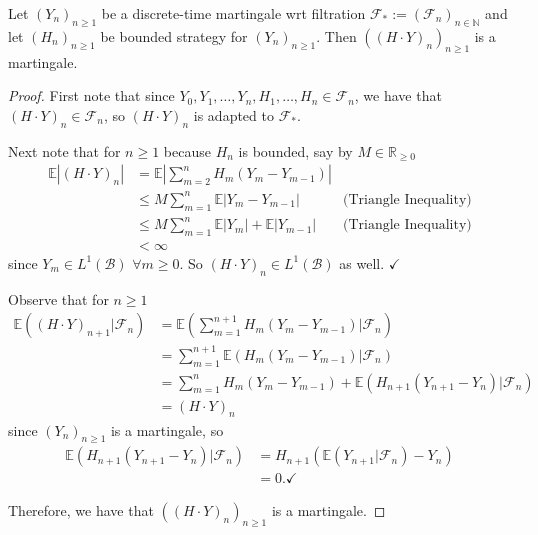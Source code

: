 \begin{proposition}
    \label{fairness_preservation}
    Let $(Y_{n})_{n \geq 1}$ be a discrete-time martingale wrt filtration $\mathcal{F}_{*} := (\mathcal{F}_{n})_{n \in \mathbb{N}}$ and let \((H_{n})_{n \geq 1}\) be bounded strategy for \((Y_{n})_{n \geq 1}\). Then \(((H \cdot Y)_{n})_{n \geq 1}\) is a martingale.
\end{proposition}
\begin{proof}
    First note that since \(Y_{0}, Y_{1}, \dots, Y_{n}, H_{1}, \dots, H_{n} \in \mathcal{F}_{n}\), we have that \((H \cdot Y)_{n} \in \mathcal{F}_{n}\), so \((H \cdot Y)_{n}\) is adapted to \(\mathcal{F}_{*}\).
    
    Next note that for $n \geq 1$ because $H_{n}$ is bounded, say by $M \in \mathbb{R}_{\geq 0}$ 
    \begin{align*}
        \mathbb{E}|(H \cdot Y)_{n}| &= \mathbb{E}\left|\sum\limits_{m=2}^{n}H_{m}(Y_{m} - Y_{m-1})\right|\\
        &\leq M \sum\limits_{m=1}^{n} \mathbb{E}|Y_{m} - Y_{m-1}| & \text{(Triangle Inequality)}\\
        &\leq M \sum\limits_{m=1}^{n} \mathbb{E}|Y_{m}| + \mathbb{E}| Y_{m-1}| & \text{(Triangle Inequality)}\\
        &< \infty
    \end{align*}
    since $Y_{m} \in L^{1}(\mathcal{B})$ $\forall m \geq 0$. So $(H \cdot Y)_{n} \in L^{1}(\mathcal{B})$ as well. $\checkmark$

    Observe that for $n \geq 1$
    \begin{align*}
        \mathbb{E}((H \cdot Y)_{n+1} | \mathcal{F}_{n}) &= \mathbb{E}(\sum\limits_{m=1}^{n+1} H_{m}(Y_{m} - Y_{m-1}) | \mathcal{F}_{n})\\
        &=\sum\limits_{m=1}^{n+1}\mathbb{E}(H_{m}(Y_{m} - Y_{m-1}) | \mathcal{F}_{n})\\
        &=\sum\limits_{m=1}^{n}H_{m}(Y_{m} - Y_{m-1}) + \mathbb{E}(H_{n+1} (Y_{n+1} - Y_{n}) | \mathcal{F}_{n})\\
        &= (H \cdot Y)_{n}
    \end{align*}
    since \((Y_{n})_{n \geq 1}\) is a martingale, so
    \begin{align*}
        \mathbb{E}(H_{n+1} (Y_{n+1} - Y_{n}) | \mathcal{F}_{n}) &= H_{n+1} (\mathbb{E}(Y_{n+1} | \mathcal{F}_{n}) -Y_{n})\\
        &= 0. \checkmark
    \end{align*}
     
    Therefore, we have that \(((H \cdot Y)_{n})_{n \geq 1}\) is a martingale.
\end{proof}

